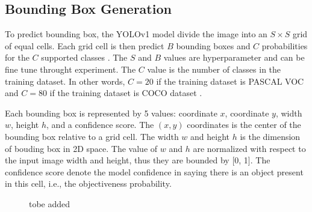 \subsection{Bounding Box Generation}
To predict bounding box, the YOLOv1 model divide the image into an $S \times S$ grid of equal cells. Each grid cell is then predict $B$ bounding boxes and $C$ probabilities for the $C$ supported classes \cite{yolov1_2016}. The $S$ and $B$ values are hyperparameter and can be fine tune throught experiment. The $C$ value is the number of classes in the training dataset. In other words, $C=20$ if the training dataset is PASCAL VOC \cite{pascal_voc_2015} and $C=80$ if the training dataset is COCO dataset \cite{coco_2014}.

Each bounding box is represented by 5 values: coordinate $x$, coordinate $y$, width $w$, height $h$, and a confidence score. The $(x, y)$ coordinates is the center of the bounding box relative to a grid cell. The width $w$ and height $h$  is the dimension of bouding box in 2D space. The value of $w$ and $h$ are normalized with respect to the input image width and height, thus they are bounded by [0, 1]. The confidence score denote the model confidence in saying there is an object present in this cell, i.e., the objectiveness probability.

\begin{figure}[!ht]
    \centering
    \qquad \qquad
    \caption{{\color{red} tobe added}}
\end{figure}


